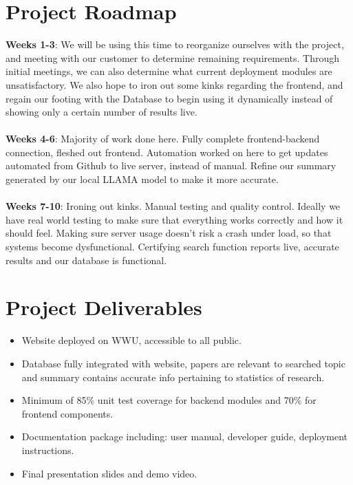 \documentclass{article}
\begin{document}
\section*{Project Roadmap}
\textbf{Weeks 1-3}: We will be using this time to reorganize ourselves with the project, and meeting with our customer to determine remaining requirements. Through initial meetings, we can also determine what current deployment modules are unsatisfactory. We also hope to iron out some kinks regarding the frontend, and regain our footing with the Database to begin using it dynamically instead of showing only a certain number of results live. 
\\\\
\textbf{Weeks 4-6}: Majority of work done here. Fully complete frontend-backend connection, fleshed out frontend. Automation worked on here to get updates automated from Github to live server, instead of manual. Refine our summary generated by our local LLAMA model to make it more accurate. 
\\\\
\textbf{Weeks 7-10}: Ironing out kinks. Manual testing and quality control. Ideally we have real world testing to make sure that everything works correctly and how it should feel. Making sure server usage doesn't risk a crash under load, so that systems become dysfunctional. Certifying search function reports live, accurate results and our database is functional.

\section*{Project Deliverables}
\begin{itemize}
    \item Website deployed on WWU, accessible to all public.
    \item Database fully integrated with website, papers are relevant to searched topic and summary contains accurate info pertaining to statistics of research.
    \item Minimum of 85\% unit test coverage for backend modules and 70\% for frontend components.  
    \item Documentation package including: user manual, developer guide, deployment instructions.  
    \item Final presentation slides and demo video.  
\end{itemize}
\end{document}
